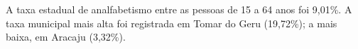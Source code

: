 A taxa estadual de analfabetismo entre as pessoas de 15 a 64 anos foi 9,01\%. A taxa municipal mais alta foi registrada em Tomar do Geru (19,72\%); a mais baixa, em Aracaju (3,32\%).
